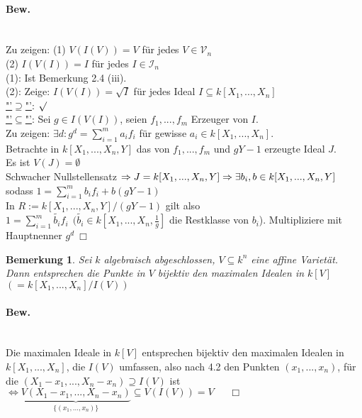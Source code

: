 \documentclass[a4paper,12pt]{report}
\theoremstyle{break}
\newtheorem{Bem}[Def]{Bemerkung}
\theoremstyle{nonumberbreak}
\theoremstyle{nonumberplain}
\begin{document}
\paragraph{Bew.}~\\
Zu zeigen: (1) $V(I(V))=V$ für jedes $V\in \mathcal{V}_n$\\
(2) $I(V(I))=I$ für jedes $I\in \mathcal{I}_n$\\
(1): Ist Bemerkung 2.4 (iii).\\
(2): Zeige: $I(V(I))= \sqrt{I}$ für jedes Ideal $I\subseteq k[X_1,...,X_n]$\\
\underline{"'$\supseteq$"'}: $\surd$\\
\underline{"'$\subseteq$"'}: Sei $g\in I(V(I))$, seien $f_1,...,f_m$ Erzeuger von $I$.\\
Zu zeigen: $\exists d:g^d=\sum_{i=1}^m a_if_i$ für gewisse $a_i\in k[X_1,...,X_n]$.\\
Betrachte in $k[X_1,...,X_n,Y]$ das von $f_1,...,f_m$ und $gY-1$ erzeugte Ideal $J$.\\
Es ist $V(J)=\emptyset$\\
Schwacher Nullstellensatz $\Rightarrow J=k[X_1,...,X_n,Y]\\
\Rightarrow \exists b_i,b \in k[X_1,...,X_n,Y]$ sodass $1=\sum_{i=1}^m b_if_i + b(gY-1)$\\
In $R:= k[X_1,...,X_n,Y]/(gY-1)$ gilt also\\
$1=\sum_{i=1}^m\tilde{b_i}f_i~~ (\tilde{b_i}\in k[X_1,...,X_n,\frac{1}{g}]$ die Restklasse von $b_i$). Multipliziere mit Hauptnenner $g^d~\Box$
\begin{Bem}
Sei $k$ algebraisch abgeschlossen, $V\subseteq k^n$ eine affine Varietät. Dann entsprechen die Punkte in $V$ bijektiv den maximalen Idealen in $k[V]$ $(=k[X_1,...,X_n]/ I(V))$
\end{Bem}
\paragraph{Bew.}~\\
Die maximalen Ideale in $k[V]$ entsprechen bijektiv den maximalen Idealen in $k[X_1,...,X_n]$, die $I(V)$ umfassen, also nach 4.2 den Punkten $(x_1,...,x_n)$, für die $(X_1-x_1,...,X_n-x_n)\supseteq I(V)$ ist\\
$\Leftrightarrow \underbrace{V(X_1-x_1,...,X_n-x_n)}_{\{(x_1,...,x_n)\}}\subseteq V(I(V))= V ~~~~~~~\Box$
\end{document}
